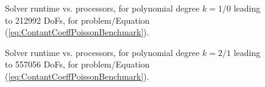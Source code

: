\graphicspath{{./apdx-MPISolverPerformance/strongScaling/NSESphere/plots/}}

\begin{figure}[h!]
	\begin{center}
		
	\end{center}
	\caption{
		Solver runtime vs. processors, for polynomial degree $k=1/0$ leading to 212992 DoFs,
		for problem/Equation (\ref{eq:ContantCoeffPoissonBenchmark}).
	}
	\label{fig:Spherek1Time}
\end{figure}

\graphicspath{{./apdx-MPISolverPerformance/strongScaling/NSESphereComplex/plots/}}

\begin{figure}[h!]
	\begin{center}
		
	\end{center}
	\caption{
		Solver runtime vs. processors, for polynomial degree $k=2/1$ leading to 557056 DoFs,
		for problem/Equation (\ref{eq:ContantCoeffPoissonBenchmark}).
	}
	\label{fig:Spherek1Time}
\end{figure}